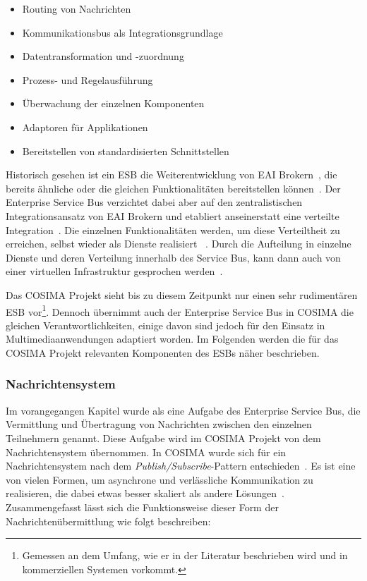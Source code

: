   \begin{itemize}
    \item Routing von Nachrichten
    \item Kommunikationsbus als Integrationsgrundlage
    \item Datentransformation und -zuordnung
    \item Prozess- und Regelausführung
    \item Überwachung der einzelnen Komponenten
    \item Adaptoren für Applikationen
    \item Bereitstellen von standardisierten Schnittstellen
  \end{itemize}

  Historisch gesehen ist ein ESB die Weiterentwicklung von EAI Brokern~, die bereits ähnliche oder die gleichen Funktionalitäten bereitstellen können~\citep[S. 146]{masak2007ssb}. Der Enterprise Service Bus verzichtet dabei aber auf den zentralistischen Integrationsansatz von EAI Brokern und etabliert anseinerstatt eine verteilte Integration~\citep[S. 4]{enterprise_service_bus}. Die einzelnen Funktionalitäten werden, um diese Verteiltheit zu erreichen, selbst wieder als Dienste realisiert ~\citep{enterprise_service_bus,masak2007ssb,papazoglou2007soc}. Durch die Aufteilung in einzelne Dienste und deren Verteilung innerhalb des Service Bus, kann dann auch von einer virtuellen Infrastruktur gesprochen werden~\citep[S. 136]{soa_goes_real}.
  
  Das COSIMA Projekt sieht bis zu diesem Zeitpunkt nur einen sehr rudimentären ESB vor\footnote{Gemessen an dem Umfang, wie er in der Literatur beschrieben wird und in kommerziellen Systemen vorkommt.}. Dennoch übernimmt auch der Enterprise Service Bus in COSIMA die gleichen Verantwortlichkeiten, einige davon sind jedoch für den Einsatz in Multimediaanwendungen adaptiert worden. Im Folgenden werden die für das COSIMA Projekt relevanten Komponenten des ESBs näher beschrieben.
  
\subsubsection{Nachrichtensystem} %
\label{ssub:nachrichtensystem}
  
  Im vorangegangen Kapitel wurde als eine Aufgabe des Enterprise Service Bus, die Vermittlung und Übertragung von Nachrichten zwischen den einzelnen Teilnehmern genannt. Diese Aufgabe wird im COSIMA Projekt von dem Nachrichtensystem übernommen. In COSIMA wurde sich für ein Nachrichtensystem nach dem \emph{Publish/Subscribe}-Pattern entschieden~\citep[S. 106]{enterprise_integration_patterns}. Es ist eine von vielen Formen, um asynchrone und verlässliche Kommunikation zu realisieren, die dabei etwas besser skaliert als andere Lösungen~\citep[S. 69]{web_services_principles_and_technology}. Zusammengefasst lässt sich die Funktionsweise dieser Form der Nachrichtenübermittlung wie folgt beschreiben:
  
